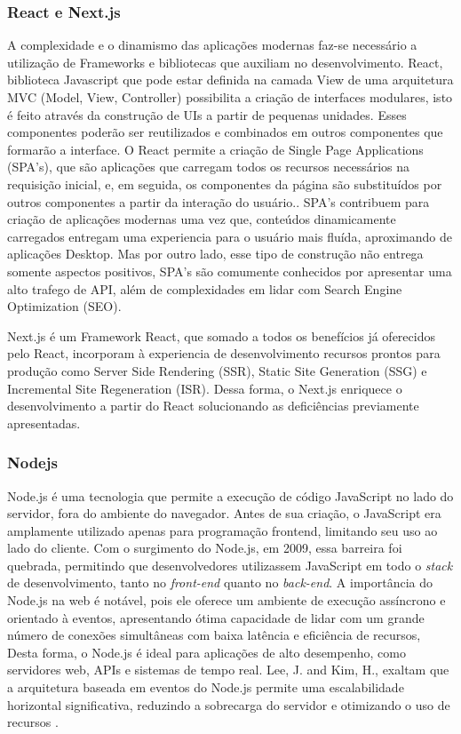 \subsubsection{React e Next.js}

A complexidade e o dinamismo das aplicações modernas faz-se necessário a utilização de Frameworks e bibliotecas que auxiliam no desenvolvimento. React, biblioteca Javascript que pode estar definida na camada View de uma arquitetura MVC (Model, View, Controller) possibilita a criação de interfaces modulares, isto é feito através da construção de UIs a partir de pequenas unidades. Esses componentes poderão ser reutilizados e combinados em outros componentes que formarão a interface.\cite{react} 
O React permite a criação de Single Page Applications (SPA's), que são aplicações que carregam todos os recursos necessários na requisição inicial, e, em seguida, os componentes da página são substituídos por outros componentes a partir da interação do usuário.\cite{jadhav2015single}. SPA's contribuem para criação de aplicações modernas uma vez que, conteúdos dinamicamente carregados entregam uma experiencia para o usuário mais fluída, aproximando de aplicações Desktop. Mas por outro lado, esse tipo de construção não entrega somente aspectos positivos, SPA's são comumente conhecidos por apresentar uma alto trafego de API, além de complexidades em lidar com Search Engine Optimization (SEO)\cite{konshin2018next}.

Next.js é um Framework React, que somado a todos os benefícios já oferecidos pelo React, incorporam à experiencia de desenvolvimento recursos prontos para produção como Server Side Rendering (SSR), Static Site Generation (SSG) e Incremental Site Regeneration (ISR)\cite{dinku2022react}. Dessa forma, o Next.js enriquece o desenvolvimento a partir do React solucionando as deficiências previamente apresentadas.

\subsubsection{Nodejs}

Node.js é uma tecnologia que permite a execução de código JavaScript no lado do servidor, fora do ambiente do navegador. Antes de sua criação, o JavaScript era amplamente utilizado apenas para programação frontend, limitando seu uso ao lado do cliente. Com o surgimento do Node.js, em 2009, essa barreira foi quebrada, permitindo que desenvolvedores utilizassem JavaScript em todo o \textit{stack} de desenvolvimento, tanto no \textit{front-end} quanto no \textit{back-end}. A importância do Node.js na web é notável, pois ele oferece um ambiente de execução assíncrono e orientado à eventos, apresentando ótima capacidade de lidar com um grande número de conexões simultâneas com baixa latência e eficiência de recursos, Desta forma, o Node.js é ideal para aplicações de alto desempenho, como servidores web, APIs e sistemas de tempo real. Lee, J. and Kim, H., exaltam que a arquitetura baseada em eventos do Node.js permite uma escalabilidade horizontal significativa, reduzindo a sobrecarga do servidor e otimizando o uso de recursos \cite{lee2019nodejs}.

